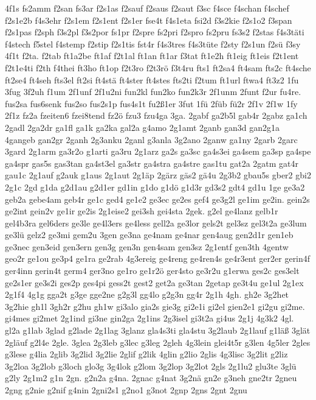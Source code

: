{4f1s
fs2amm
f2san
fs3ar
f2s1as
f2sauf
f2saus
f2saut
f3sc
f4sce
f4schan
f4schef
f2s1e2b
f4s3ehr
f2s1em
f2s1ent
f2s1er
fse4t
f4s1eta
fsi2d
f3s2kie
f2s1o2
f3span
f2s1pas
f2sph
f3s2pl
f3s2por
fs1pr
f2spre
fs2pri
f2spro
fs2pru
fs3s2
f2stas
f4s3täti
f4stech
f5stel
f4stemp
f2stip
f2s1tis
fst4r
f4s3tres
f4s3tüte
f2sty
f2s1un
f2sü
f3sy
4f1t
f2ta.
f2tab
ft1a2be
ft1af
f2t1al
ft1an
ft1ar
f3tat
ft1e2h
ft1eig
ft1eis
f2t1ent
f2t1e4ti
f2th
f4thei
ft3ho
ft1op
f2t3ro
f2t3rö
f3t4ru
fts1
ft2sa4
ft4sam
fts2c
ft4sche
ft2se4
ft4seh
fts3el
ft2si
ft4stä
ft4ster
ft4stes
fts2ti
f2tum
ft1url
ftwa4
ft3z2
1fu
3fug
3f2uh
f1um
2f1unf
2f1u2ni
fun2kl
fun2ko
fun2k3r
2f1unm
2funt
f2ur
fu4re.
fus2sa
fus6senk
fus2so
fus2s1p
fus4s1t
fu2ß1er
3fut
1fü
2füb
fü2r
2f1v
2f1w
1fy
2f1z
fz2a
fzeiten6
fzei8tend
fz2ö
fzu3
fzu4ga
3ga.
2gabf
ga2b5l
gab4r
2gabz
ga1ch
2gadl
2ga2dr
ga1fl
ga1k
ga2ka
gal2a
g4amo
2g1amt
2ganb
gan3d
gan2g1a
4gangeb
gan2gr
2ganh
2g3anku
2ganl
g3anla
3g2ano
2ganw
ga1ny
2garb
2garc
3gard
2g1arm
ga3r2o
g1arti
ga3ru
2g1arz
ga2s
ga3sc
ga4s3ei
ga4sem
ga3sp
ga4spe
ga4spr
gas5s
gas3tan
ga4st3el
ga3str
ga4stra
ga4stre
gas1tu
gat2a
2gatm
gat4r
gau1c
2g1auf
g2auk
g1aus
2g1aut
2g1äp
2gärz
gäs2
gä4u
2g3b2
gbau5s
gber2
gbi2
2g1c
2gd
g1da
g2d1au
g2d1er
gd1in
g1do
g1dö
g1d3r
gd3s2
gdt4
gd1u
1ge
ge3a2
geb2a
gebe4am
geb4r
ge1c
ged4
ge1e2
ge3ec
ge2es
gef4
ge3g2l
ge1im
ge2in.
gein2s
ge2int
gein2v
ge1ir
ge2is
2g1eise2
gei3sh
gei4sta
2gek.
g2el
ge4lanz
gelb1r
gel4b3ra
gel6ders
ge3le
ge4l3ers
ge4less
gell2a
ge3lor
gels2t
gel3sz
gel3t2a
ge3lum
ge3lü
gelz2
ge3mi
gem2u
3gen
ge3na
ge4nam
ge4nar
gen4aug
gen2d1r
gen1eb
ge3nec
gen3eid
gen3ern
gen3g
gen3n
gen4sam
gen3sz
2g1entf
gen3th
4gentw
geo2r
ge1ou
ge3p4
ge1ra
ge2rab
4g3ereig
ge4reng
ge4ren4s
ge4r3ent
ger2er
gerin4f
ger4inn
gerin4t
germ4
ger3no
ge1ro
ge1r2ö
ger4sto
ge3r2u
g1erwa
ges2c
ges3elt
ge2s1er
ge3s2i
ges2p
ges4pi
gess2t
gest2
get2a
ge3tan
2getap
ge3t4u
ge1ul
2g1ex
2g1f4
4g1g
gga2t
g3ge
gge2ne
g2g3l
gg4lo
g2g3n
gg4r
2g1h
4gh.
gh2e
3g2het
3g2hie
gh1l
3gh2r
g2hu
gh1w
gi3alo
gia2s
gie3g
gi2e1i
gi2el
gien2e1
gi2gu
gi2me.
gi4mes
gi2met
2g1ind
gi3ne
gin2ga
2g1ins
2g3isel
gi3t2a
gi4us
2g1j
4g3k2
4gl.
gl2a
g1lab
3glad
g2lade
2g1lag
3glanz
gla4s3ti
gla4stu
3g2laub
2g1lauf
g1läß
3glät
2gläuf
g2l4e
2gle.
3glea
2g3leb
g3lec
g3leg
2gleh
4g3lein
glei4t5r
g3len
4g5ler
2gles
g3lese
g4lia
2glib
3g2lid
3g2lie
2glif
g2lik
4glin
g2lio
2glis
4g3lisc
3g2lit
g2liz
3g2loa
3g2lob
g3loch
glo3g
3g4lok
g2lom
3g2lop
3g2lot
2gls
2g1lu2
glu3te
3glü
g2ly
2g1m2
g1n
2gn.
g2n2a
g4na.
2gnac
g4nat
3g2nä
gn2e
g3neh
gne2tr
2gneu
2gng
g2nie
g2nif
g4nin
2gni2s1
g2no1
g3not
2gnp
2gns
2gnt
2gnu
}
